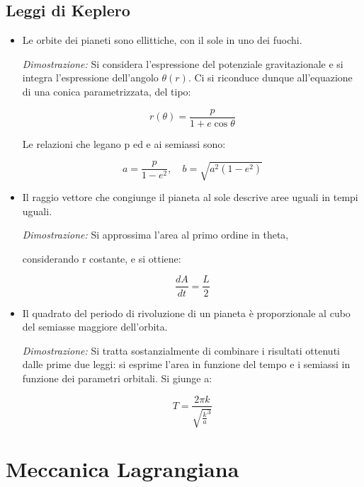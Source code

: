 \documentclass{article}
\begin{document}
\subsection*{Leggi di Keplero}
\begin{itemize}
    \item Le orbite dei pianeti sono ellittiche, con il sole in uno dei fuochi.

          \textit{Dimostrazione:} Si considera l'espressione del potenziale gravitazionale e si integra l'espressione  dell'angolo $\theta(r)$.
          Ci si riconduce dunque all'equazione di una conica parametrizzata, del tipo:

          \begin{equation}
              r(\theta)= \frac{p}{1+e\cos{\theta}}
          \end{equation}

          Le relazioni che legano p ed e ai semiassi sono:

          \begin{equation}
              a= \frac{p}{1-e^2}, \quad b= \sqrt{a^2(1-e^2)}
          \end{equation}
    \item Il raggio vettore che congiunge il pianeta al sole descrive aree uguali in tempi uguali.

          \textit{Dimostrazione:} Si approssima l'area al primo ordine in theta,

          considerando r costante, e si ottiene:

          \begin{equation}
              \frac{dA}{dt}= \frac{L}{2}
          \end{equation}

    \item Il quadrato del periodo di rivoluzione di un pianeta è proporzionale al cubo del semiasse maggiore dell'orbita.

          \textit{Dimostrazione:} Si tratta sostanzialmente di combinare i risultati ottenuti dalle prime due leggi: si esprime l'area in funzione del tempo e i semiassi in funzione dei parametri orbitali.
          Si giunge a:

          \begin{equation}
              T= \frac{2\pi k}{\sqrt{\frac{k}{a}^3}}
          \end{equation}
\end{itemize}



\section{Meccanica Lagrangiana}
\end{document}
